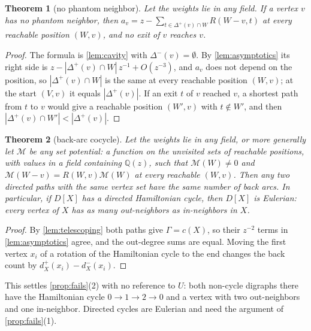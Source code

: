 \documentclass[11pt]{amsart}
\theoremstyle{plain}
\newtheorem{theorem}{Theorem}[section]
\theoremstyle{definition}
\theoremstyle{remark}
\numberwithin{equation}{section}
\newcommand{\QQ}{\mathbb{Q}}
\newcommand{\Qz}{\QQ(z)}
\newcommand{\Mpot}{\mathcal{M}}           %
\begin{document}
\begin{theorem}[no phantom neighbor]\label{thm:no-phantom}
Let the weights lie in any field. If a vertex $v$ has no phantom neighbor, then $a_v=z-\sum_{t\in\Delta^{+}(v)\cap W}R(W-v,t)$ at every reachable position $(W,v)$, and no exit of $v$ reaches $v$.
\end{theorem}
\begin{proof}
The formula is \cref{lem:cavity} with $\Delta^{-}(v)=\emptyset$. By \cref{lem:asymptotics} its right side is $z-|\Delta^{+}(v)\cap W|\,z^{-1}+O(z^{-3})$, and $a_v$ does not depend on the position, so $|\Delta^{+}(v)\cap W|$ is the same at every reachable position $(W,v)$; at the start $(V,v)$ it equals $|\Delta^{+}(v)|$. If an exit $t$ of $v$ reached $v$, a shortest path from $t$ to $v$ would give a reachable position $(W',v)$ with $t\notin W'$, and then $|\Delta^{+}(v)\cap W'|<|\Delta^{+}(v)|$.
\end{proof}

\begin{theorem}[back-arc cocycle]\label{thm:cocycle}
Let the weights lie in any field, or more generally let $\Mpot$ be any \emph{set potential}: a function on the unvisited sets of reachable positions, with values in a field containing $\Qz$, such that $\Mpot(W)\neq0$ and $\Mpot(W-v)=R(W,v)\Mpot(W)$ at every reachable $(W,v)$. Then any two directed paths with the same vertex set have the same number of back arcs. In particular, if $D[X]$ has a directed Hamiltonian cycle, then $D[X]$ is Eulerian: every vertex of $X$ has as many out-neighbors as in-neighbors in $X$.
\end{theorem}
\begin{proof}
By \cref{lem:telescoping} both paths give $\Gamma=c(X)$, so their $z^{-2}$ terms in \cref{lem:asymptotics} agree, and the out-degree sums are equal. Moving the first vertex $x_i$ of a rotation of the Hamiltonian cycle to the end changes the back count by $d^{+}_X(x_i)-d^{-}_X(x_i)$.
\end{proof}

This settles \cref{prop:fails}(2) with no reference to $U$: both non-cycle digraphs there have the Hamiltonian cycle $0\to1\to2\to0$ and a vertex with two out-neighbors and one in-neighbor. Directed cycles are Eulerian and need the argument of \cref{prop:fails}(1).
\end{document}
